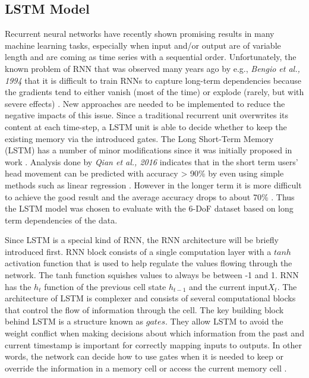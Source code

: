 \subsection{LSTM Model}
\label{sec:impl:model:arch:lstm}
Recurrent neural networks have recently shown promising results in many machine learning tasks, especially when input and/or output are of variable length and are coming as time series with a sequential order. Unfortunately, the known problem of RNN that was observed many years ago by e.g., \textit{Bengio et al., 1994} that it is difficult to train RNNs to capture long-term dependencies because the gradients tend to either vanish (most of the time) or explode (rarely, but with severe effects) \cite{rnn_difficults}. New approaches are needed to be implemented to reduce the negative impacts of this issue. Since a traditional recurrent unit overwrites its content at each time-step, a LSTM unit is able to decide whether to keep the existing memory via the introduced gates. The Long Short-Term Memory (LSTM) has a number of minor modifications \cite{empirical_evaluation} since it was initially proposed in work \cite{lstm_orig}.
Analysis done by \textit{Qian et al., 2016} indicates that in the short term users’ head movement can be predicted with accuracy > 90\% by even using simple methods such as linear regression \cite{cellular_opt}. However in the longer term it is more difficult to achieve the good result and the average accuracy drops to about 70\% \cite{cellular_opt}. Thus the LSTM model was chosen to evaluate with the 6-DoF dataset based on long term dependencies of the data. 

Since LSTM is a special kind of RNN, the RNN architecture will be briefly introduced first. RNN block consists of a single computation layer with a $tanh$ activation function that is used to help regulate the values flowing through the network. The tanh function squishes values to always be between -1 and 1. RNN has the $h_{t}$ function of the previous cell state $h_{t-1}$ and the current input$ X_{t}$. The architecture of LSTM is complexer and consists of several computational blocks that control the flow of information through the cell. The key building block behind LSTM is a structure known as $gates$. They allow LSTM to avoid the weight conflict when making decisions about which information from the past and current timestamp is important for correctly mapping inputs to outputs. In other words, the network can decide how to use gates when it is needed to keep or override the information in a memory cell or access the current memory cell \cite{lstm_orig}.


